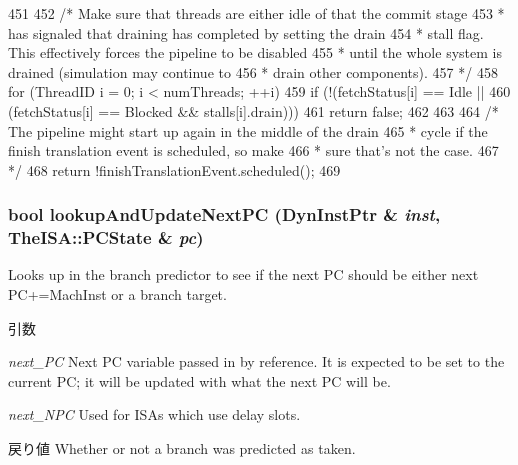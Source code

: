 \begin{DoxyCode}
451 {
452     /* Make sure that threads are either idle of that the commit stage
453      * has signaled that draining has completed by setting the drain
454      * stall flag. This effectively forces the pipeline to be disabled
455      * until the whole system is drained (simulation may continue to
456      * drain other components).
457      */
458     for (ThreadID i = 0; i < numThreads; ++i) {
459         if (!(fetchStatus[i] == Idle ||
460               (fetchStatus[i] == Blocked && stalls[i].drain)))
461             return false;
462     }
463 
464     /* The pipeline might start up again in the middle of the drain
465      * cycle if the finish translation event is scheduled, so make
466      * sure that's not the case.
467      */
468     return !finishTranslationEvent.scheduled();
469 }
\end{DoxyCode}
\hypertarget{classDefaultFetch_a033e8df655743382b3cb870600f70f82}{
\subsubsection[{lookupAndUpdateNextPC}]{\setlength{\rightskip}{0pt plus 5cm}bool lookupAndUpdateNextPC ({\bf DynInstPtr} \& {\em inst}, \/  TheISA::PCState \& {\em pc})}}
\label{classDefaultFetch_a033e8df655743382b3cb870600f70f82}
Looks up in the branch predictor to see if the next PC should be either next PC+=MachInst or a branch target. 
\begin{DoxyParams}{引数}
\item[{\em next\_\-PC}]Next PC variable passed in by reference. It is expected to be set to the current PC; it will be updated with what the next PC will be. \item[{\em next\_\-NPC}]Used for ISAs which use delay slots. \end{DoxyParams}
\begin{DoxyReturn}{戻り値}
Whether or not a branch was predicted as taken. 
\end{DoxyReturn}



